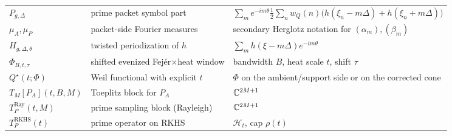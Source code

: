\begin{table}[h]
\begin{tabular}{lll}
$P_{g,\Delta}$ & prime packet symbol part & $\sum_m e^{-im\theta}\frac12\sum_n w_Q(n)\bigl(h(\xi_n-m\Delta)+h(\xi_n+m\Delta)\bigr)$ \\
$\mu_A,\mu_P$ & packet-side Fourier measures & secondary Herglotz notation for $(\alpha_m),(\beta_m)$ \\
$H_{g,\Delta,\theta}$ & twisted periodization of $h$ & $\sum_m h(\xi-m\Delta)e^{-im\theta}$ \\
$\Phi_{B,t,\tau}$ & shifted evenized Fej\'er$\times$heat window & bandwidth $B$, heat scale $t$, shift $\tau$ \\
$Q^\star(t;\Phi)$ & Weil functional with explicit $t$ & $\Phi$ on the ambient/support side or on the corrected cone \\
$T_M[P_A](t,B,M)$ & Toeplitz block for $P_A$ & $\mathbb C^{2M+1}$ \\
$T_P^{\mathrm{Ray}}(t,M)$ & prime sampling block (Rayleigh) & $\mathbb C^{2M+1}$ \\
$T_P^{\mathrm{RKHS}}(t)$ & prime operator on RKHS & $\mathcal H_t$, cap $\rho(t)$ \\
\bottomrule
\end{tabular}
\end{table}

